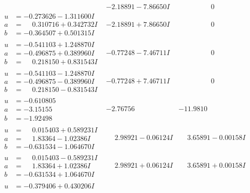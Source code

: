\documentclass[1p]{elsarticle_modified}
\theoremstyle{definition}
\begin{document}
$$\begin{array}{c|c|c}
 & -2.18891 - 7.86650 I & \phantom{-0.000000 } 0 \\ \hline\begin{aligned}
u &= -0.273626 - 1.311600 I \\
a &= \phantom{-}0.310716 + 0.342732 I \\
b &= -0.364507 + 0.501315 I\end{aligned}
 & -2.18891 + 7.86650 I & \phantom{-0.000000 } 0 \\ \hline\begin{aligned}
u &= -0.541103 + 1.248870 I \\
a &= -0.496875 + 0.389960 I \\
b &= \phantom{-}0.218150 + 0.831543 I\end{aligned}
 & -0.77248 - 7.46711 I & \phantom{-0.000000 } 0 \\ \hline\begin{aligned}
u &= -0.541103 - 1.248870 I \\
a &= -0.496875 - 0.389960 I \\
b &= \phantom{-}0.218150 - 0.831543 I\end{aligned}
 & -0.77248 + 7.46711 I & \phantom{-0.000000 } 0 \\ \hline\begin{aligned}
u &= -0.610805\phantom{ +0.000000I} \\
a &= -3.15155\phantom{ +0.000000I} \\
b &= -1.92498\phantom{ +0.000000I}\end{aligned}
 & -2.76756\phantom{ +0.000000I} & -11.9810\phantom{ +0.000000I} \\ \hline\begin{aligned}
u &= \phantom{-}0.015403 + 0.589231 I \\
a &= \phantom{-}1.83364 - 1.02386 I \\
b &= -0.631534 - 1.064670 I\end{aligned}
 & \phantom{-}2.98921 - 0.06124 I & \phantom{-}3.65891 - 0.00158 I \\ \hline\begin{aligned}
u &= \phantom{-}0.015403 - 0.589231 I \\
a &= \phantom{-}1.83364 + 1.02386 I \\
b &= -0.631534 + 1.064670 I\end{aligned}
 & \phantom{-}2.98921 + 0.06124 I & \phantom{-}3.65891 + 0.00158 I \\ \hline\begin{aligned}
u &= -0.379406 + 0.430206 I \\

\end{aligned}
\end{array}$$
\end{document}
